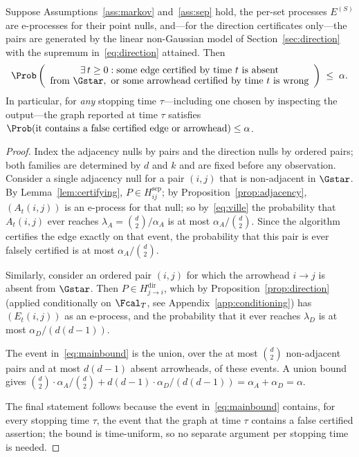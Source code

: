 \begin{theorem}\label{thm:main}
Suppose Assumptions~\ref{ass:markov} and~\ref{ass:sep} hold, the per-set
processes $E^{(S)}$ are e-processes for their point nulls, and---for the
direction certificates only---the pairs are generated by the linear
non-Gaussian model of Section~\ref{sec:direction} with the supremum
in~\eqref{eq:direction} attained. Then
\begin{equation}\label{eq:mainbound}
\Prob\left(
\begin{array}{c}
\exists\, t \ge 0 : \text{some edge certified by time $t$ is absent} \\[-1pt]
\text{from } \Gstar, \text{ or some arrowhead certified by time $t$
  is wrong}
\end{array}
\right) \;\le\; \alpha .
\end{equation}
In particular, for \emph{any} stopping time $\tau$---including one chosen by
inspecting the output---the graph reported at time $\tau$ satisfies
$\Prob(\text{it contains a false certified edge or arrowhead}) \le \alpha$.
\end{theorem}

\begin{proof}
Index the adjacency nulls by pairs and the direction nulls by ordered pairs;
both families are determined by $d$ and $k$ and are fixed before any
observation. Consider a single adjacency null for a pair $(i,j)$ that is
non-adjacent in $\Gstar$. By Lemma~\ref{lem:certifying}, $P \in
H^{\mathrm{sep}}_{ij}$; by Proposition~\ref{prop:adjacency}, $(A_t(i,j))$ is
an e-process for that null; so by~\eqref{eq:ville} the probability that
$A_t(i,j)$ ever reaches $\lambda_A = \binom{d}{2}/\alpha_A$ is at most
$\alpha_A / \binom{d}{2}$. Since the algorithm certifies the edge exactly on
that event, the probability that this pair is ever falsely certified is at
most $\alpha_A/\binom{d}{2}$.

Similarly, consider an ordered pair $(i,j)$ for which the arrowhead $i \to j$
is absent from $\Gstar$. Then $P \in H^{\mathrm{dir}}_{j \to i}$, which by
Proposition~\ref{prop:direction} (applied conditionally on $\Fcal_T$, see
Appendix~\ref{app:conditioning}) has $(E_t(i,j))$ as an e-process, and the
probability that it ever reaches $\lambda_D$ is at most
$\alpha_D / (d(d-1))$.

The event in~\eqref{eq:mainbound} is the union, over the at most
$\binom{d}{2}$ non-adjacent pairs and at most $d(d-1)$ absent arrowheads, of
these events. A union bound gives
$\binom{d}{2} \cdot \alpha_A/\binom{d}{2} + d(d-1) \cdot \alpha_D/(d(d-1))
= \alpha_A + \alpha_D = \alpha$.

The final statement follows because the event in~\eqref{eq:mainbound}
contains, for every stopping time $\tau$, the event that the graph at time
$\tau$ contains a false certified assertion; the bound is time-uniform, so no
separate argument per stopping time is needed.
\end{proof}

